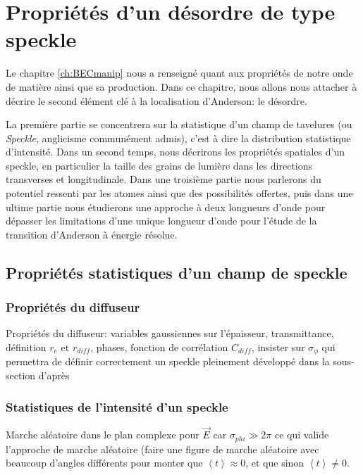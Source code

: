 \chapter{Propriétés d'un désordre de type speckle}

Le chapitre \ref{ch:BECmanip} nous a renseigné quant aux propriétés de notre onde de matière ainsi que sa production. Dans ce chapitre, nous allons nous attacher à décrire le second élément clé à la localisation d'Anderson: le désordre. 

La première partie se concentrera sur la statistique d'un champ de tavelures (ou \emph{Speckle}, anglicisme communément admis), c'est à dire la distribution statistique d'intensité. Dans un second temps, nous décrirons les propriétés spatiales d'un speckle, en particulier la taille des grains de lumière dans les directions transverses et longitudinale. Dans une troisième partie nous parlerons du potentiel ressenti par les atomes ainsi que des possibilités offertes, puis dans une ultime partie nous étudierons une approche à deux longueurs d'onde pour dépasser les limitations d'une unique longueur d'onde pour l'étude de la transition d'Anderson à énergie résolue.

\section{Propriétés statistiques d'un champ de speckle}

\subsection{Propriétés du diffuseur}
Propriétés du diffuseur: variables gaussiennes sur l'épaisseur, transmittance, définition $r_e$ et $r_{diff}$, phases, fonction de corrélation $C_{diff}$, insister sur $\sigma_{\phi}$ qui permettra de définir correctement un speckle pleinement développé dans la sous-section d'après

\subsection{Statistiques de l'intensité d'un speckle}
Marche aléatoire dans le plan complexe pour $\vec{E}$ car $\sigma_{phi} \gg 2\pi$ ce qui valide l'approche de marche aléatoire (faire une figure de marche aléatoire avec beaucoup d'angles différents pour monter que $\left\langle t \right\rangle\approx 0$, et que sinon $\left\langle t \right\rangle\neq 0$.

